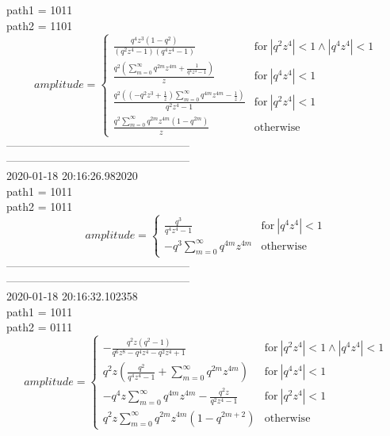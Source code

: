 path1 = 1011\\
path2 = 1101\\
$$amplitude = \begin{cases} \frac{q^{4} z^{3} \left(1 - q^{2}\right)}{\left(q^{2} z^{4} - 1\right) \left(q^{4} z^{4} - 1\right)} & \text{for}\: \left|{q^{2} z^{4}}\right| < 1 \wedge \left|{q^{4} z^{4}}\right| < 1 \\\frac{q^{2} \left(\sum_{m=0}^{\infty} q^{2 m} z^{4 m} + \frac{1}{q^{4} z^{4} - 1}\right)}{z} & \text{for}\: \left|{q^{4} z^{4}}\right| < 1 \\\frac{q^{2} \left(\left(- q^{2} z^{3} + \frac{1}{z}\right) \sum_{m=0}^{\infty} q^{4 m} z^{4 m} - \frac{1}{z}\right)}{q^{2} z^{4} - 1} & \text{for}\: \left|{q^{2} z^{4}}\right| < 1 \\\frac{q^{2} \sum_{m=0}^{\infty} q^{2 m} z^{4 m} \left(1 - q^{2 m}\right)}{z} & \text{otherwise} \end{cases}$$
--------------------------------------------------\\
--------------------------------------------------\\
2020-01-18 20:16:26.982020\\
path1 = 1011\\
path2 = 1011\\
$$amplitude = \begin{cases} \frac{q^{3}}{q^{4} z^{4} - 1} & \text{for}\: \left|{q^{4} z^{4}}\right| < 1 \\- q^{3} \sum_{m=0}^{\infty} q^{4 m} z^{4 m} & \text{otherwise} \end{cases}$$
--------------------------------------------------\\
--------------------------------------------------\\
2020-01-18 20:16:32.102358\\
path1 = 1011\\
path2 = 0111\\
$$amplitude = \begin{cases} - \frac{q^{2} z \left(q^{2} - 1\right)}{q^{6} z^{8} - q^{4} z^{4} - q^{2} z^{4} + 1} & \text{for}\: \left|{q^{2} z^{4}}\right| < 1 \wedge \left|{q^{4} z^{4}}\right| < 1 \\q^{2} z \left(\frac{q^{2}}{q^{4} z^{4} - 1} + \sum_{m=0}^{\infty} q^{2 m} z^{4 m}\right) & \text{for}\: \left|{q^{4} z^{4}}\right| < 1 \\- q^{4} z \sum_{m=0}^{\infty} q^{4 m} z^{4 m} - \frac{q^{2} z}{q^{2} z^{4} - 1} & \text{for}\: \left|{q^{2} z^{4}}\right| < 1 \\q^{2} z \sum_{m=0}^{\infty} q^{2 m} z^{4 m} \left(1 - q^{2 m + 2}\right) & \text{otherwise} \end{cases}$$
